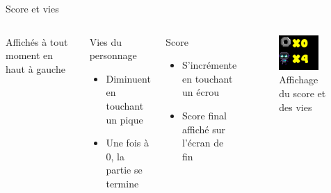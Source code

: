 \documentclass{beamer}
\begin{document}
{\begin{frame}{Score et vies}
    \begin{columns}
            Affichés à tout moment en haut à gauche
            \begin{block}{Vies du personnage}
                \begin{itemize}
                    \item[\bullet] Diminuent en touchant un pique
                    \item[\bullet] Une fois à 0, la partie se termine
                \end{itemize}
            \end{block}
            \begin{block}{Score}
                \begin{itemize}
                    \item[\bullet] S'incrémente en touchant un écrou
                    \item[\bullet] Score final affiché sur l'écran de fin
                \end{itemize}
            \end{block}
            \begin{figure}
                \centering
                \includegraphics[width=0.8\textwidth]{images/Screenshot from 2025-03-23 23-14-37.png}
                \caption{Affichage du score et des vies}
            \end{figure}
    \end{columns}
\end{frame}

}
\end{document}
